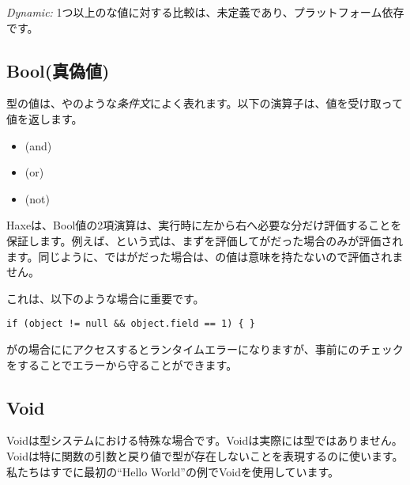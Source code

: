 \emph{Dynamic:}
1つ以上のな値に対する比較は、未定義であり、プラットフォーム依存です。

\subsection{Bool(真偽値)}
\label{types-bool}


型の値は、やのような\emph{条件文}によく表れます。以下の演算子は、値を受け取って値を返します。

\begin{itemize}
	\item \expr{\&\&} (and)
	\item \expr{||} (or)
	\item \expr{!} (not)
\end{itemize}

Haxeは、Bool値の2項演算は、実行時に左から右へ必要な分だけ評価することを保証します。例えば、という式は、まずを評価してがだった場合のみが評価されます。同じように、ではがだった場合は、の値は意味を持たないので評価されません。

これは、以下のような場合に重要です。

\begin{lstlisting}
if (object != null && object.field == 1) { }
\end{lstlisting}

がの場合ににアクセスするとランタイムエラーになりますが、事前にのチェックをすることでエラーから守ることができます。

\subsection{Void}
\label{types-void}


Voidは型システムにおける特殊な場合です。Voidは実際には型ではありません。Voidは特に関数の引数と戻り値で型が存在しないことを表現するのに使います。私たちはすでに最初の``Hello World''の例でVoidを使用しています。

